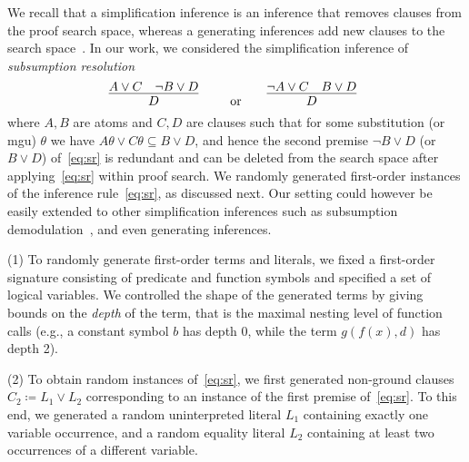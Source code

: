 We recall that a simplification inference is an inference
that removes clauses from the proof search space, whereas a generating
inferences add new clauses to the search space~\cite{Vampire13}. In our work, we
considered the simplification inference of 
\emph{subsumption resolution} 
\begin{equation}\label{eq:sr}
    \infer[]{
      D
      }{
      A\vee C
      &
      {\neg B \vee D}
    }
    \qquad \text{or}\qquad
    \infer[]{
      D
      }{
      \neg A\vee C
      &
      {B \vee D}
    }
      \end{equation}
      where $A,B$ are atoms and $C,D$ are clauses
      such that for some substitution (or mgu) $\theta$ we have $A\theta\vee
C\theta\subseteq B\vee D$, and hence the second premise $\neg B \vee
D$ (or $B \vee
D$) of~\eqref{eq:sr} is redundant and can  be deleted from the search
space after applying~\eqref{eq:sr} within proof search.
%
We randomly generated first-order instances of the inference rule~\eqref{eq:sr}, as
discussed next. Our setting could however be easily extended to other
simplification inferences such as subsumption demodulation~\cite{Rath20},
and even generating inferences.

\noindent (1) To randomly generate first-order terms and literals,
we fixed a first-order signature consisting of %
predicate and function symbols and specified a set of logical
variables. 
We controlled the shape of the generated terms
by giving bounds on the \emph{depth} of the term,
that is the maximal nesting level of function calls
(e.g., a constant symbol $b$ has depth 0, while the term $g(f(x),d)$ has depth 2).\smallskip


\noindent (2)  To obtain random instances of~\eqref{eq:sr}, 
we first generated non-ground clauses $C_2 \coloneqq L_1 \lor L_2$
corresponding to an instance of the first premise of~\eqref{eq:sr}.
To this end, we generated a random uninterpreted literal $L_1$ containing exactly one variable occurrence,
and a random equality literal $L_2$ containing at least two occurrences of a different variable.\smallskip

